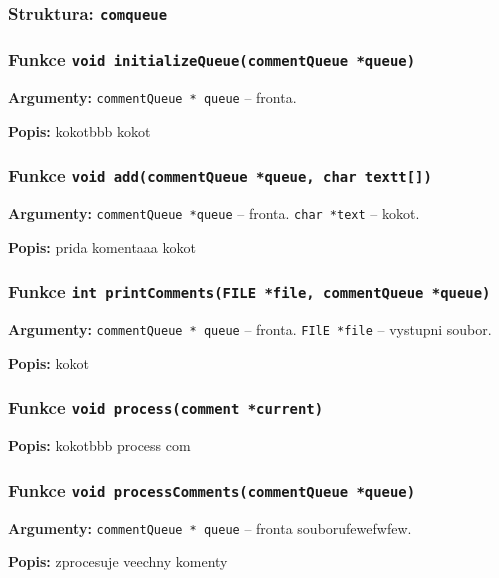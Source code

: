 \documentclass[12pt, a4paper]{article}
\begin{document}
\subsubsection{Struktura: \texttt{comqueue }}
\subsubsection{Funkce \texttt{void initializeQueue(commentQueue *queue)}}
\textbf{Argumenty: }\verb"commentQueue * queue" -- fronta. \\
\par\noindent
\textbf{Popis: }kokotbbb kokot\\
\par\noindent
\subsubsection{Funkce \texttt{void add(commentQueue *queue, char textt[])}}
\textbf{Argumenty: }\verb"commentQueue *queue" -- fronta. \verb"char *text" -- kokot. \\
\par\noindent
\textbf{Popis: }prida komentaaa kokot\\
\par\noindent
\subsubsection{Funkce \texttt{int printComments(FILE *file, commentQueue *queue)}}
\textbf{Argumenty: }\verb"commentQueue * queue" -- fronta. \verb"FIlE *file" -- vystupni soubor. \\
\par\noindent
\textbf{Popis: }kokot\\
\par\noindent
\subsubsection{Funkce \texttt{void process(comment *current)}}
\textbf{Popis: }kokotbbb process com\\
\par\noindent
\subsubsection{Funkce \texttt{void processComments(commentQueue *queue)}}
\textbf{Argumenty: }\verb"commentQueue * queue" -- fronta souborufewefwfew. \\
\par\noindent
\textbf{Popis: }zprocesuje veechny komenty\\
\par\noindent
\end{document}
